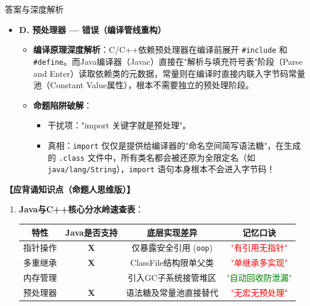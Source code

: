 \documentclass[12pt, a4paper]{ctexart}
\begin{document}
\begin{enumerate}[label=\textbf{\arabic*.}]
\begin{bluebox}{答案与深度解析}
\begin{itemize}[leftmargin=*]
			      \item \textbf{D. 预处理器 — 错误（编译管线重构）}
			            \begin{itemize}[leftmargin=*, nosep]
				            \item \textbf{编译原理深度解析}：C/C++依赖预处理器在编译前展开 \texttt{\#include} 和 \texttt{\#define}。而Java编译器（Javac）直接在"解析与填充符号表"阶段（Parse and Enter）读取依赖类的元数据，常量则在编译时直接内联入字节码常量池（Constant Value属性），根本不需要独立的预处理阶段。
				            \item \textbf{命题陷阱破解}：
				                  \begin{itemize}
					                  \item 干扰项："import 关键字就是预处理"。
					                  \item 真相：\texttt{import} 仅仅是提供给编译器的"命名空间简写语法糖"，在生成的 \texttt{.class} 文件中，所有类名都会被还原为全限定名（如 \texttt{java/lang/String}），\texttt{import} 语句本身根本不会进入字节码！
				                  \end{itemize}
			            \end{itemize}
		      \end{itemize}

		      \textbf{【应背诵知识点（命题人思维版）】}
		      \begin{enumerate}[leftmargin=*, nosep]
			      \item \textbf{Java与C++核心分水岭速查表}：
			            \begin{tabular}{|c|c|c|c|}
				            \hline
				            \textbf{特性} & \textbf{Java是否支持} & \textbf{底层实现差异}        & \textbf{记忆口诀}                \\
				            \hline
				            指针操作        & \textbf{X}        & 仅暴露安全引用 (\texttt{oop}) & \textcolor{red}{"有引用无指针"}    \\
				            \hline
				            多重继承        & \textbf{X}        & ClassFile结构限单父类        & \textcolor{red}{"单继承多实现"}    \\
				            \hline
				            内存管理        & \checkmark        & 引入GC子系统接管堆区            & \textcolor{green}{"自动回收防泄漏"} \\
				            \hline
				            预处理器        & \textbf{X}        & 语法糖及常量池直接替代            & \textcolor{red}{"无宏无预处理"}    \\
				            \hline
			            \end{tabular}


\end{enumerate}
\end{bluebox}
\end{enumerate}
\end{document}

